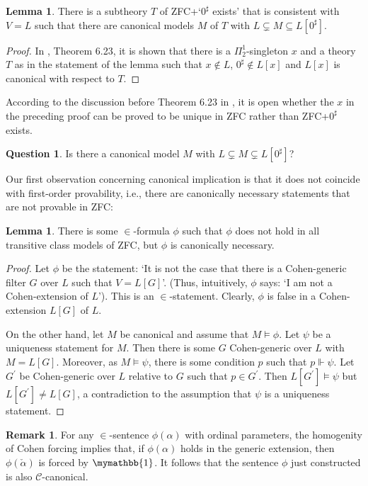 \documentclass[a4paper,12pt]{amsart}
\theoremstyle{definition}
\newtheorem{lemma}[fact]{Lemma}
\newtheorem{remark}[fact]{Remark}
\newtheorem{question}[fact]{Question}
\begin{document}
\begin{lemma}
 There is a subtheory $T$ of ZFC+`$0^{\sharp}$ exists' that is consistent with $V=L$ such that there are canonical models $M$ of $T$ with $L\subsetneq M\subseteq L[0^{\sharp}]$. 
\end{lemma}
\begin{proof}
In \cite{Fr}, Theorem 6.23, it is shown that there is a $\Pi^{1}_{2}$-singleton $x$ and a theory $T$ as in the statement of the lemma such that $x\notin L$, $0^{\sharp}\notin L[x]$ and $L[x]$ is canonical with respect to $T$.
\end{proof}

According to the discussion before Theorem 6.23 in \cite{Fr}, it is open whether the $x$ in the preceding proof can be proved to be unique in ZFC rather than ZFC+$0^{\sharp}$ exists.

\begin{question}
Is there a canonical model $M$ with $L\subsetneq M\subsetneq L[0^{\sharp}]$?
\end{question}



Our first observation concerning canonical implication is that it does not coincide with first-order provability, i.e., there are canonically necessary statements that are not provable in ZFC:

\begin{lemma}
 There is some $\in$-formula $\phi$ such that $\phi$ does not hold in all transitive class models of ZFC, but $\phi$ is canonically necessary.
\end{lemma}
\begin{proof}
 Let $\phi$ be the statement: `It is not the case that there is a Cohen-generic filter $G$ over $L$ such that $V=L[G]$'. (Thus, intuitively, $\phi$ says: `I am not a Cohen-extension of $L$').
This is an $\in$-statement. Clearly, $\phi$ is false in a Cohen-extension $L[G]$ of $L$.

On the other hand, let $M$ be canonical and assume that $M\models\phi$. Let $\psi$ be a uniqueness statement for $M$. Then there is some $G$ Cohen-generic over $L$ with $M=L[G]$. Moreover,
as $M\models\psi$, there is some condition $p$ such that $p\Vdash\psi$. Let $G^{\prime}$ be Cohen-generic over $L$ relative to $G$ such that $p\in G^{\prime}$.
Then $L[G^{\prime}]\models\psi$ but $L[G^{\prime}]\neq L[G]$, a contradiction to the assumption that $\psi$ is a uniqueness statement.
\end{proof}

\begin{remark}
For any $\in$-sentence $\phi(\alpha)$ with ordinal parameters, the homogenity of Cohen forcing implies that, if $\phi(\alpha)$ holds in the generic extension, then $\phi(\check{\alpha})$ is forced by $\mymathbb{1}$. It follows that the sentence $\phi$ just constructed is also $\mathcal{C}$-canonical. 
\end{remark}
\end{document}
